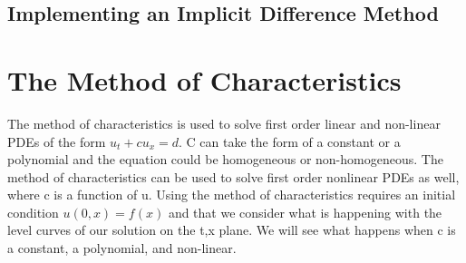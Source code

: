 \documentclass{article}
\newcommand{\red}[1]{\textcolor{red}{#1}}
\newcommand{\blue}[1]{\textcolor{blue}{#1}}
\begin{document}
    
    
    

\subsection{Implementing an Implicit Difference Method}
    
    
\section{The Method of Characteristics}
The method of characteristics is used to solve first order linear and non-linear PDEs of the form $u_t+cu_x = d$.
C can take the form of a constant or a polynomial and the equation could be homogeneous or non-homogeneous. The method of characteristics can be used to solve first order nonlinear PDEs as well, where c is a function of u. Using the method of characteristics requires an initial condition $u(0,x)=f(x)$ and that we consider what is happening with the level curves of our solution on the t,x plane. We will see what happens when c is a constant, a polynomial, and non-linear. 
\end{document}
